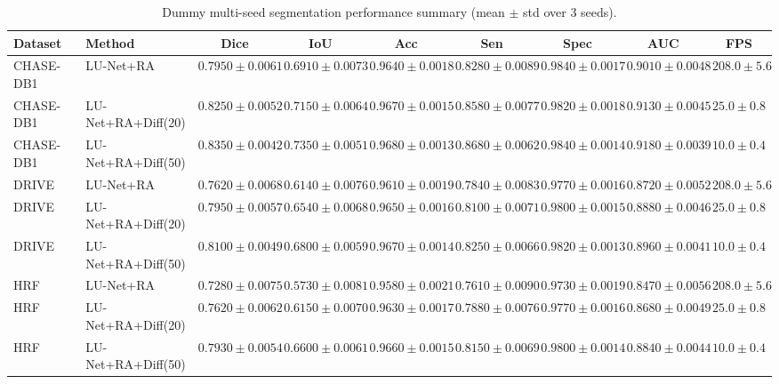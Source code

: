 \begin{table}[H]
\centering
\caption{Dummy multi-seed segmentation performance summary (mean $\pm$ std over 3 seeds).}
\label{tab:dummy_multiseed_summary}
\small
\begin{tabular}{llccccccc}
\toprule
Dataset & Method & Dice & IoU & Acc & Sen & Spec & AUC & FPS \\
\midrule
CHASE-DB1 & LU-Net+RA & $0.7950 \pm 0.0061$ & $0.6910 \pm 0.0073$ & $0.9640 \pm 0.0018$ & $0.8280 \pm 0.0089$ & $0.9840 \pm 0.0017$ & $0.9010 \pm 0.0048$ & $208.0 \pm 5.6$ \\
CHASE-DB1 & LU-Net+RA+Diff(20) & $0.8250 \pm 0.0052$ & $0.7150 \pm 0.0064$ & $0.9670 \pm 0.0015$ & $0.8580 \pm 0.0077$ & $0.9820 \pm 0.0018$ & $0.9130 \pm 0.0045$ & $25.0 \pm 0.8$ \\
CHASE-DB1 & LU-Net+RA+Diff(50) & $0.8350 \pm 0.0042$ & $0.7350 \pm 0.0051$ & $0.9680 \pm 0.0013$ & $0.8680 \pm 0.0062$ & $0.9840 \pm 0.0014$ & $0.9180 \pm 0.0039$ & $10.0 \pm 0.4$ \\
\midrule
DRIVE & LU-Net+RA & $0.7620 \pm 0.0068$ & $0.6140 \pm 0.0076$ & $0.9610 \pm 0.0019$ & $0.7840 \pm 0.0083$ & $0.9770 \pm 0.0016$ & $0.8720 \pm 0.0052$ & $208.0 \pm 5.6$ \\
DRIVE & LU-Net+RA+Diff(20) & $0.7950 \pm 0.0057$ & $0.6540 \pm 0.0068$ & $0.9650 \pm 0.0016$ & $0.8100 \pm 0.0071$ & $0.9800 \pm 0.0015$ & $0.8880 \pm 0.0046$ & $25.0 \pm 0.8$ \\
DRIVE & LU-Net+RA+Diff(50) & $0.8100 \pm 0.0049$ & $0.6800 \pm 0.0059$ & $0.9670 \pm 0.0014$ & $0.8250 \pm 0.0066$ & $0.9820 \pm 0.0013$ & $0.8960 \pm 0.0041$ & $10.0 \pm 0.4$ \\
\midrule
HRF & LU-Net+RA & $0.7280 \pm 0.0075$ & $0.5730 \pm 0.0081$ & $0.9580 \pm 0.0021$ & $0.7610 \pm 0.0090$ & $0.9730 \pm 0.0019$ & $0.8470 \pm 0.0056$ & $208.0 \pm 5.6$ \\
HRF & LU-Net+RA+Diff(20) & $0.7620 \pm 0.0062$ & $0.6150 \pm 0.0070$ & $0.9630 \pm 0.0017$ & $0.7880 \pm 0.0076$ & $0.9770 \pm 0.0016$ & $0.8680 \pm 0.0049$ & $25.0 \pm 0.8$ \\
HRF & LU-Net+RA+Diff(50) & $0.7930 \pm 0.0054$ & $0.6600 \pm 0.0061$ & $0.9660 \pm 0.0015$ & $0.8150 \pm 0.0069$ & $0.9800 \pm 0.0014$ & $0.8840 \pm 0.0044$ & $10.0 \pm 0.4$ \\
\bottomrule
\end{tabular}
\end{table}
